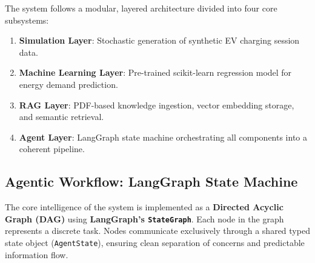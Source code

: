\documentclass[12pt,a4paper]{article}
\newcommand{\code}[1]{\texttt{\small\color{blue!70!black}#1}}
\begin{document}
The system follows a modular, layered architecture divided into four core subsystems:

\begin{enumerate}
    \item \textbf{Simulation Layer}: Stochastic generation of synthetic EV charging session data.
    \item \textbf{Machine Learning Layer}: Pre-trained scikit-learn regression model for energy demand prediction.
    \item \textbf{RAG Layer}: PDF-based knowledge ingestion, vector embedding storage, and semantic retrieval.
    \item \textbf{Agent Layer}: LangGraph state machine orchestrating all components into a coherent pipeline.
\end{enumerate}

\subsection{Agentic Workflow: LangGraph State Machine}

The core intelligence of the system is implemented as a \textbf{Directed Acyclic Graph (DAG)} using \textbf{LangGraph's \code{StateGraph}}. Each node in the graph represents a discrete task. Nodes communicate exclusively through a shared typed state object (\code{AgentState}), ensuring clean separation of concerns and predictable information flow.

\vspace{0.5cm}
\begin{center}
\end{center}
\vspace{0.5cm}
\end{document}
